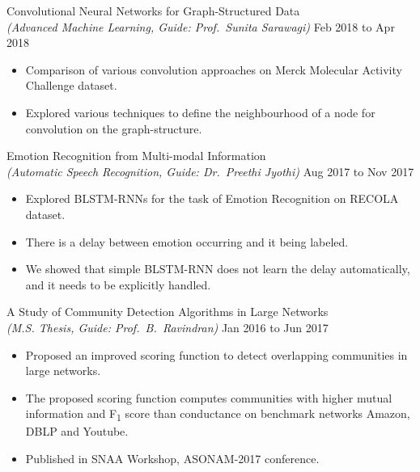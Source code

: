 \documentclass[10pt]{article}
\newenvironment{innerlist}[1][\enskip\textbullet]%
        {\begin{itemize}[#1,leftmargin=*,parsep=0pt,itemsep=0pt,topsep=0pt,partopsep=0pt]}
        {\end{itemize}}
\newcommand{\halfblankline}{\quad\vspace{-0.5\baselineskip}\pagebreak[3]}
\begin{document}
Convolutional Neural Networks for Graph-Structured Data \\
\emph{(Advanced Machine Learning, Guide: Prof.\ Sunita Sarawagi)} \hfill{Feb 2018 to Apr 2018}
\vspace{0.1in}
\begin{innerlist}
	\item Comparison of various convolution approaches on Merck Molecular Activity Challenge dataset.
	\item Explored various techniques to define the neighbourhood of a node for convolution on the graph-structure.
\end{innerlist}

\halfblankline
\vspace{0.1275in}

Emotion Recognition from Multi-modal Information \\
\emph{(Automatic Speech Recognition, Guide: Dr.\ Preethi Jyothi)} \hfill{Aug 2017 to Nov 2017}
\vspace{0.1in}
\begin{innerlist}
	\item Explored BLSTM-RNNs for the task of Emotion Recognition on RECOLA dataset.
	\item There is a delay between emotion occurring and it being labeled.
	\item We showed that simple BLSTM-RNN does not learn the delay automatically, and it needs to be explicitly handled.
\end{innerlist}

\halfblankline
\vspace{0.1275in}

A Study of Community Detection Algorithms in Large Networks \\
\emph{(M.S. Thesis, Guide: Prof.\ B.\ Ravindran)} \hfill{Jan 2016 to Jun 2017}
\vspace{0.1in}
\begin{innerlist}
	\item Proposed an improved scoring function to detect overlapping communities in large networks.
	\item The proposed scoring function computes communities with higher mutual information and F\textsubscript{1} score than conductance on benchmark networks Amazon, DBLP and Youtube.
	\item Published in SNAA Workshop, ASONAM-2017 conference.
\end{innerlist}
\end{document}
